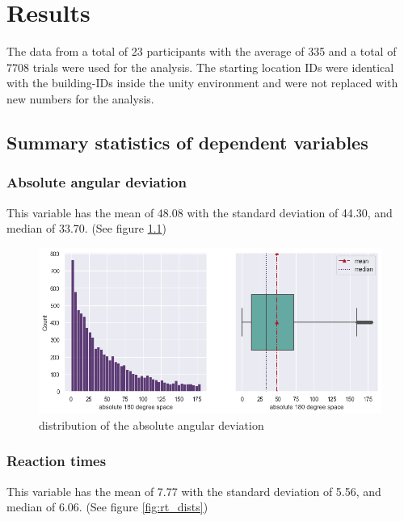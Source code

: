 \chapter{Results}

The data from a total of 23 participants with the average of 335 and a total of 7708 trials were used for the analysis. The starting location IDs were identical with the building-IDs inside the unity environment and were not replaced with new numbers for the analysis.

\section{Summary statistics of dependent variables}

\subsection{Absolute angular deviation}

This variable has the mean of 48.08 with the standard deviation of 44.30, and median of 33.70. (See figure \ref{fig:angular_dev_dists})

\begin{figure}[h]
	\centering
	\includegraphics[width=150mm]{figures/angular_deviation_hist_box_23.png}
	\caption[Distribution of the absolute angular deviation]{distribution of the absolute angular deviation}
	\label{fig:angular_dev_dists}
\end{figure}

\subsection{Reaction times}

This variable has the mean of 7.77 with the standard deviation of 5.56, and median of 6.06. (See figure \ref{fig:rt_dists})

